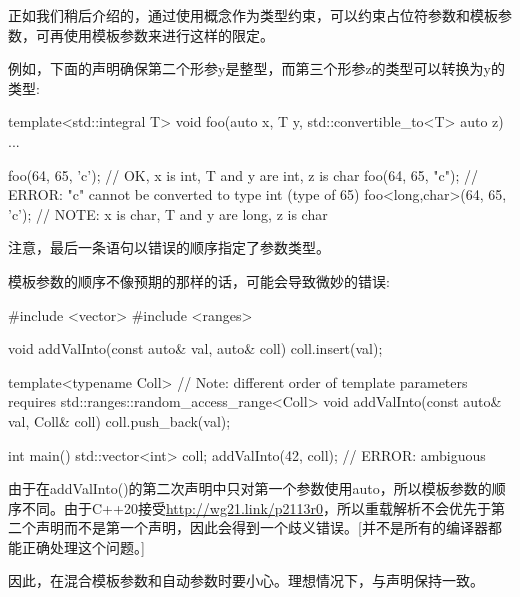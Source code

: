正如我们稍后介绍的，通过使用概念作为类型约束，可以约束占位符参数和模板参数，可再使用模板参数来进行这样的限定。

例如，下面的声明确保第二个形参y是整型，而第三个形参z的类型可以转换为y的类型:

\begin{cpp}
template<std::integral T>
void foo(auto x, T y, std::convertible_to<T> auto z)
{
	...
}

foo(64, 65, 'c'); // OK, x is int, T and y are int, z is char
foo(64, 65, "c"); // ERROR: "c" cannot be converted to type int (type of 65)
foo<long,char>(64, 65, 'c'); // NOTE: x is char, T and y are long, z is char
\end{cpp}

注意，最后一条语句以错误的顺序指定了参数类型。

模板参数的顺序不像预期的那样的话，可能会导致微妙的错误:


\begin{cpp}
#include <vector>
#include <ranges>

void addValInto(const auto& val, auto& coll)
{
	coll.insert(val);
}

template<typename Coll> // Note: different order of template parameters
requires std::ranges::random_access_range<Coll>
void addValInto(const auto& val, Coll& coll)
{
	coll.push_back(val);
}

int main()
{
	std::vector<int> coll;
	addValInto(42, coll); // ERROR: ambiguous
}
\end{cpp}

由于在addValInto()的第二次声明中只对第一个参数使用auto，所以模板参数的顺序不同。由于C++20接受\url{http://wg21.link/p2113r0}，所以重载解析不会优先于第二个声明而不是第一个声明，因此会得到一个歧义错误。[并不是所有的编译器都能正确处理这个问题。]

因此，在混合模板参数和自动参数时要小心。理想情况下，与声明保持一致。











